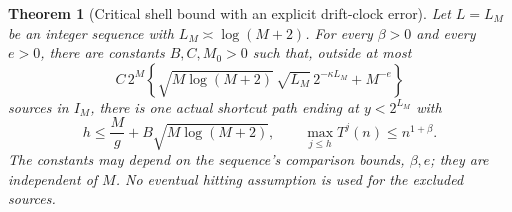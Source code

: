 \documentclass[11pt]{article}
\newtheorem{theorem}[proposition]{Theorem}
\theoremstyle{remark}\newtheorem{remark}[proposition]{Remark}
\begin{document}
\begin{theorem}[Critical shell bound with an explicit drift-clock error]
\label{thm:shaik-shell-drift}
Let \(L=L_M\) be an integer sequence with \(L_M\asymp\log(M+2)\).
For every \(\beta>0\) and every \(e>0\), there are constants
\(B,C,M_0>0\) such that, outside at most
\begin{equation}\label{eq:shaik-shell-reconstruction}
 C\,2^M\left\{\sqrt{M\log(M+2)}\,\sqrt{L_M}\,
                   2^{-\kappa L_M}+M^{-e}\right\}
\end{equation}
sources in \(I_M\), there is one actual shortcut path ending at \(y<2^{L_M}\)
with
\begin{equation}\label{eq:shaik-drift-clock}
 h\le \frac M g+B\sqrt{M\log(M+2)},\qquad
 \max_{j\le h}T^j(n)\le n^{1+\beta}.
\end{equation}
The constants may depend on the sequence's comparison bounds, \(\beta,e\);
they are independent of \(M\). No eventual hitting assumption is used
for the excluded sources.
\end{theorem}
\end{document}

